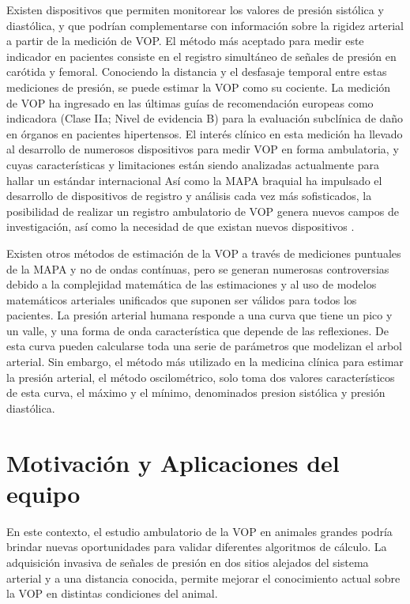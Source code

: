 Existen dispositivos que permiten monitorear los valores de presión sistólica y diastólica, y que podrían complementarse con información sobre la rigidez arterial a partir de la medición de VOP. El método más aceptado para medir este indicador en pacientes consiste en el registro simultáneo de señales de presión en carótida y femoral. Conociendo la distancia y el desfasaje temporal entre estas mediciones de presión, se puede estimar la VOP como su cociente. La medición de VOP ha ingresado en las últimas guías de recomendación europeas como indicadora (Clase IIa; Nivel de evidencia B) para la evaluación subclínica de daño en órganos en pacientes hipertensos. El interés clínico en esta medición ha llevado al desarrollo de numerosos dispositivos para medir VOP en forma ambulatoria, y cuyas características y limitaciones están siendo analizadas actualmente para hallar un estándar internacional \citep{laurent2006} Así como la MAPA braquial ha impulsado el desarrollo de dispositivos de registro y análisis cada vez más sofisticados, la posibilidad de realizar un registro ambulatorio de VOP genera nuevos campos de investigación, así como la necesidad de que existan nuevos dispositivos \citep{omboni2016}.


Existen otros métodos de estimación de la VOP a través de mediciones puntuales de la MAPA y no de ondas contínuas, pero se generan numerosas controversias debido a la complejidad matemática de las estimaciones y al uso de modelos matemáticos arteriales unificados que suponen ser válidos para todos los pacientes. 
La presión arterial humana responde a una curva que tiene un pico y un valle, y una forma de onda característica que depende de las reflexiones. De esta curva pueden calcularse toda una serie de parámetros que modelizan el arbol arterial. Sin embargo, el método más utilizado en la medicina clínica para estimar la presión arterial, el método oscilométrico, solo toma dos valores característicos de esta curva, el máximo y el mínimo, denominados presion sistólica y presión diastólica.

\section{Motivación y Aplicaciones del equipo}

En este contexto, el estudio ambulatorio de la VOP en animales grandes podría brindar nuevas oportunidades para validar diferentes algoritmos de cálculo. La adquisición invasiva de señales de presión en dos sitios alejados del sistema arterial y a una distancia conocida, permite mejorar el conocimiento actual sobre la VOP en distintas condiciones del animal.

